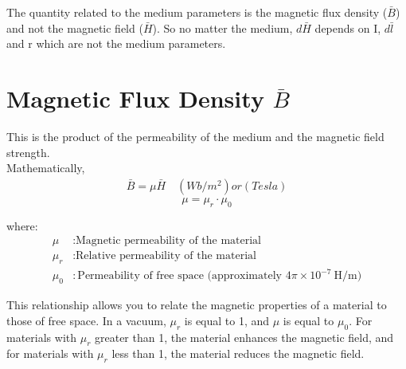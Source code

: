 The quantity related to the medium parameters is the magnetic flux density ($\bar{B}$) and not the magnetic field ($\bar{H}$). So no matter the medium, $ d\bar{H} $ depends on I, $ d\bar{l} $ and r which are not the medium parameters. 

\section{Magnetic Flux Density $\bar{B}$}
This is the product of the permeability of the medium and the magnetic field strength.\\
Mathematically, 
\begin{align}
\boxed{\bar{B} = \mu\bar{H}}\quad (Wb/m^{2}) or (Tesla)
\end{align}
	\[
\mu = \mu_r \cdot \mu_0
\]

where:
\begin{align*}
	\mu & : \text{Magnetic permeability of the material} \\
	\mu_r & : \text{Relative permeability of the material} \\
	\mu_0 & : \text{Permeability of free space (approximately } 4\pi \times 10^{-7} \ \text{H/m)}
\end{align*}

This relationship allows you to relate the magnetic properties of a material to those of free space. In a vacuum, \( \mu_r \) is equal to 1, and \( \mu \) is equal to \( \mu_0 \). For materials with \( \mu_r \) greater than 1, the material enhances the magnetic field, and for materials with \( \mu_r \) less than 1, the material reduces the magnetic field.

